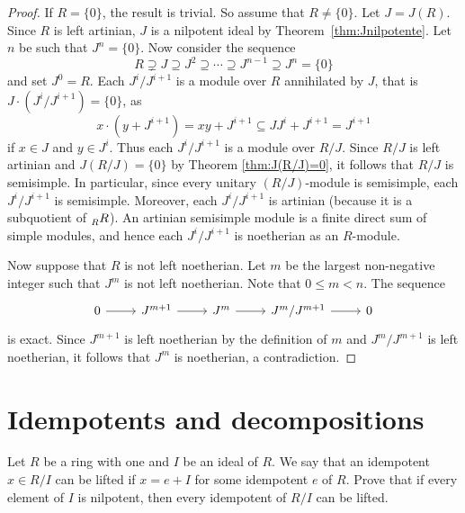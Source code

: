 \begin{proof}
	If $R=\{0\}$, the result is trivial. So assume that $R\ne\{0\}$. 
	Let $J=J(R)$. Since $R$ is left artinian, $J$ is a nilpotent ideal 
	by Theorem~\ref{thm:Jnilpotente}. Let $n$ be such that $J^n=\{0\}$. 
	Now consider the sequence 
	\[
		R\supsetneq J\supseteq J^2\supseteq\cdots\supseteq J^{n-1}\supseteq J^n=\{0\}
	\]
	and set $J^0=R$. 
	Each $J^{i}/J^{i+1}$ is a module over $R$ annihilated by $J$, 
	that is $J\cdot (J^i/J^{i+1})=\{0\}$, as 
	\[
	x\cdot (y+J^{i+1})=xy+J^{i+1}\subseteq JJ^i+J^{i+1}=J^{i+1} 
	\]
	if $x\in J$ and $y\in J^i$. 
	Thus each  
	$J^i/J^{i+1}$ is a module over $R/J$. Since $R/J$ is left artinian and 
	$J(R/J)=\{0\}$ by Theorem \ref{thm:J(R/J)=0}, it follows that $R/J$ is semisimple. 
	In particular, since every unitary $(R/J)$-module is semisimple,  
	each $J^{i}/J^{i+1}$ 
	is semisimple. Moreover, each $J^{i}/J^{i+1}$ is 
	artinian (because it is a subquotient of $\prescript{}{R}R$). 
	An artinian semisimple module is a finite
	direct sum of simple modules, and hence each 
	$J^{i}/J^{i+1}$ is noetherian as an $R$-module.  
	
	Now suppose that $R$ is not left noetherian. Let $m$ be the largest non-negative integer
	such that $J^m$ is not left noetherian. Note that $0\leq m<n$. The sequence
	\[
	 \begin{tikzcd}
        0 & J^{m+1} & J^m & J^{m}/J^{m+1} & 0
        \arrow[from=1-1, to=1-2]
        \arrow[from=1-2, to=1-3]
        \arrow[from=1-3, to=1-4]
        \arrow[from=1-4, to=1-5]
    \end{tikzcd}
	\]
	is exact. Since $J^{m+1}$ is left noetherian by the definition of $m$ 
	and $J^m/J^{m+1}$ is left noetherian, it follows that 
	$J^m$ is noetherian, a contradiction. 
\end{proof}

\section{Idempotents and decompositions}

\begin{exercise}
\label{xca:lifting_idempotents}
    Let $R$ be a ring with one and $I$ be an ideal of $R$. 
    We say that an idempotent $x\in R/I$ can be lifted if $x=e+I$ for
    some idempotent $e$ of $R$. 
    Prove that if every element of $I$ is nilpotent, then every 
    idempotent of $R/I$ can be lifted. 
\end{exercise}

